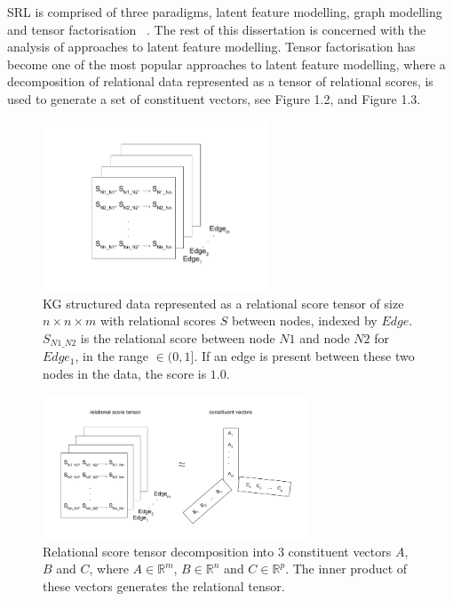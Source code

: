 \noindent SRL is comprised of three paradigms, latent feature modelling, graph modelling and tensor factorisation \unskip~\citep{nickel2015review}. The rest of this dissertation is concerned with the analysis of approaches to latent feature modelling. Tensor factorisation has become one of the most popular approaches to latent feature modelling, where a decomposition of relational data represented as a tensor of relational scores, is used to generate a set of constituent vectors, see Figure 1.2, and Figure 1.3. \par

\begin{figure}[H]
   	\centering
    	\includegraphics[width=0.6\textwidth, height=0.3\textheight]{relational_tensor.png}
	\captionsetup{justification=centering}
	\caption{KG structured data represented as a relational score tensor of size $ n \times n \times m $ with relational scores $ S $ between nodes, indexed by $ Edge $. $ S_{N1\_N2} $ is the relational score between node $ N1 $ and node $ N2 $ for $ Edge_1 $, in the range $ \in (0, 1] $. If an edge is present between these two nodes in the data, the score is $ 1.0 $.}
\end{figure}

\begin{figure}[H]
   	\centering
    	\includegraphics[width=0.7\textwidth, height=0.4\textwidth]{relational_tensor_decomposition}
	\captionsetup{justification=centering}
	\caption{Relational score tensor decomposition into $ 3 $ constituent vectors $ A $, $ B $ and $ C $, where $ A \in \mathbb{R}^m $,  $ B \in \mathbb{R}^n $ and $ C \in \mathbb{R}^p $. The inner product of these vectors generates the relational tensor.}
\end{figure}

